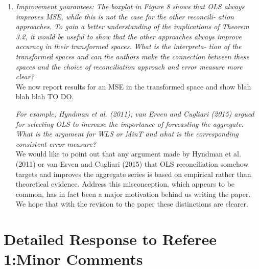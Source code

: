 \documentclass[a4paper,11pt]{article}
\begin{document}
\begin{enumerate}
		\item \textit{Improvement guarantees: The boxplot in Figure 8 shows that OLS
		always improves MSE, while this is not the case for the other reconcili-
		ation approaches. To gain a better understanding of the implications of
		Theorem 3.2, it would be useful to show that the other approaches always
		improve accuracy in their transformed spaces. What is the interpreta-
		tion of the transformed spaces and can the authors make the connection
		between these spaces and the choice of reconciliation approach and error
		measure more clear?}\\ 
	
	    We now report results for an MSE in the transformed space and show blah blah blah TO DO.
		
		\textit{For example, Hyndman et al. (2011); van Erven and
		Cugliari (2015) argued for selecting OLS to increase the importance of
		forecasting the aggregate. What is the argument for WLS or MinT and
		what is the corresponding consistent error measure?}\\
	    
	    We would like to point out that any argument made by Hyndman et al. (2011) or van Erven and Cugliari (2015) that OLS reconciliation somehow targets and improves the aggregate series is based on empirical rather than theoretical evidence.  Address this misconception, which appears to be common, has in fact been a major motivation behind us writing the paper.  We hope that with the revision to the paper these distinctions are clearer.\\
	    
	    \end{enumerate}
	    
	    \section*{Detailed Response to Referee 1:Minor Comments}
	    
\end{document}
